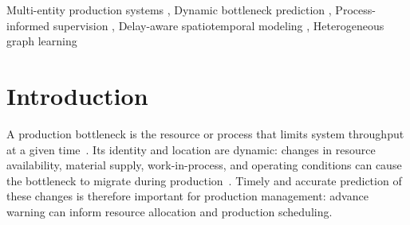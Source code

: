\documentclass[a4paper,fleqn]{cas-dc}
\newcommand{\zhpara}[1]{%
  \par\begingroup\small\color{black!72}\noindent #1\par\endgroup}
\begin{document}
\begin{abstract}
\zhpara{动态瓶颈预测是多实体生产系统中的关键任务。
现有研究在观测范围和瓶颈监督两方面存在局限。
它们主要依赖工位的单一实体数据，对工人、物料、缓冲区和物流等多类实体及其相互关系的表征有限。
这一狭窄观测范围导致工厂图建模不完整，难以刻画资源间的延迟传播，从而降低预测精度。
此外，可靠的瓶颈监督难以构造：瓶颈事件稀少，而简单的阈值标签可能把短期变化误认为持续瓶颈，并对其原因提供的信息很少。
针对上述局限，本文提出\textbf{面向延迟感知建模的过程知情异构图时空 Transformer（PHGST-DM）}。
首先，为扩展观测范围，PHGST-DM 将异构工艺—物流图与由重复运行模式引导的延迟感知建模相结合，把较早的资源状态与经传播延迟后在其他位置显现的运行变化联系起来。
其次，为改进瓶颈监督，过程知情监督为持续瓶颈及其原因生成标签，聚类则识别反复出现的运行模式。
此外，模型将瓶颈预测从简单的时间估计扩展为更完整的瓶颈描述。
它联合输出瓶颈工位、开始时刻、持续时间、过程原因和订单剩余时间。
在所评估的仿真设定下，实验表明事件预测精度高于对照基线（事件 F1-score 提升 8.2--22.1 个百分点），并能给出详细瓶颈预报；消融结果支持异构资源信息、过程知情监督和延迟感知建模各自的贡献。
这些结果凸显了 PHGST-DM 在多实体生产系统中对新兴瓶颈提供提前预警、并指导及时资源干预的潜力。}


\end{abstract}

\begin{keywords}
Multi-entity production systems \sep
Dynamic bottleneck prediction \sep
Process-informed supervision \sep
Delay-aware spatiotemporal modeling \sep
Heterogeneous graph learning
\end{keywords}

\begin{NoHyper}
\maketitle
\end{NoHyper}

\section{Introduction} \label{sec:intro}

A production bottleneck is the resource or process that limits system throughput at a given time~\cite{subramaniyan2023throughput,tang2024comprehensive}. Its identity and location are dynamic: changes in resource availability, material supply, work-in-process, and operating conditions can cause the bottleneck to migrate during production~\cite{lai2021data}. Timely and accurate prediction of these changes is therefore important for production management: advance warning can inform resource allocation and production scheduling.
\end{document}
